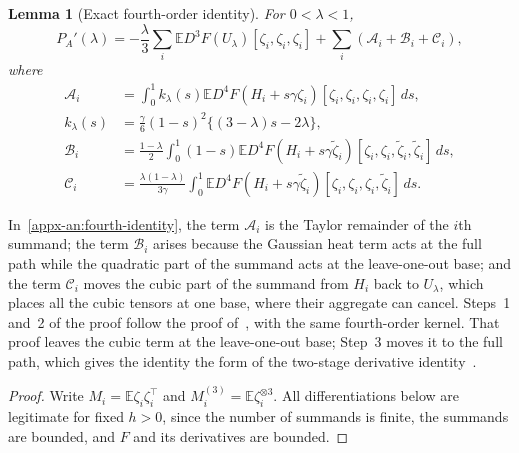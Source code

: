 \documentclass[11pt,letterpaper]{article}
\newif\ifshowrev
\newcommand{\rev}[1]{\ifshowrev{\color{revblue}%
\hypersetup{linkcolor=revblue,citecolor=revblue,urlcolor=revblue}#1}\else#1\fi}
\newenvironment{revblock}{\ifshowrev\color{revblue}%
\hypersetup{linkcolor=revblue,citecolor=revblue,urlcolor=revblue}\fi}{}
\newif\ifshowlin
\newcommand{\lin}[1]{\ifshowlin{\color{revblue}%
\hypersetup{linkcolor=revblue,citecolor=revblue,urlcolor=revblue}#1}\else#1\fi}
\newif\ifshowskill
\newcommand{\sks}[1]{\ifshowskill{\color{revblue}#1}\else#1\fi}
\newif\ifshownat
\newcommand{\nat}[1]{\ifshownat{\color{revblue}%
\hypersetup{linkcolor=revblue,citecolor=revblue,urlcolor=revblue}#1}\else#1\fi}
\newtheorem{lemma}{Lemma}
\theoremstyle{remark}
\newcommand{\E}{\mathbb E}
\newcommand{\dd}{\,d}
\begin{document}
\begin{revblock}
\begin{lemma}[Exact fourth-order identity]\label{appx-an:lem:identity}
For \(0<\lambda<1\),
\begin{equation}
 P_A'(\lambda)
 =-\frac\lambda3\sum_i\E D^3F(U_\lambda)
                    [\zeta_i,\zeta_i,\zeta_i]
       +\sum_i(\mathcal A_i+\mathcal B_i+\mathcal C_i),
 \label{appx-an:fourth-identity}
\end{equation}
where
\begin{align}
 \mathcal A_i
 &=\int_0^1 k_\lambda(s)
       \E D^4F(H_i+s\gamma\zeta_i)
                 [\zeta_i,\zeta_i,\zeta_i,\zeta_i]\dd s,
 \label{appx-an:A}\\
 k_\lambda(s)
 &=\frac\gamma6(1-s)^2\{(3-\lambda)s-2\lambda\},
 \label{appx-an:kernel}\\
 \mathcal B_i
 &=\frac{1-\lambda}{2}\int_0^1(1-s)
       \E D^4F(H_i+s\gamma\widetilde\zeta_i)
          [\zeta_i,\zeta_i,\widetilde\zeta_i,\widetilde\zeta_i]
       \dd s,
 \label{appx-an:B}\\
 \mathcal C_i
 &=\frac{\lambda(1-\lambda)}{3\gamma}\int_0^1
       \E D^4F(H_i+s\gamma\widetilde\zeta_i)
          [\zeta_i,\zeta_i,\zeta_i,\widetilde\zeta_i]\dd s.
 \label{appx-an:C}
\end{align}
\end{lemma}
\lin{In~\eqref{appx-an:fourth-identity}, the term \(\mathcal A_i\) is
the Taylor remainder of the \(i\)th summand; the term \(\mathcal B_i\) arises
because the Gaussian heat term acts at the full path while the quadratic
part of the summand acts at the leave-one-out base; and the term
\(\mathcal C_i\) moves the cubic part of the summand from \(H_i\) back to
\(U_\lambda\), which places all the cubic tensors at one base, where
their aggregate can cancel.}
\rev{Steps~1 and~2 of the proof follow \nat{the proof of~\cite[Lemma~4.1, eqs.~(20) and~(21)]{AL}}, with the same fourth-order kernel. \nat{That proof leaves} the cubic term at the leave-one-out base; Step~3 moves it to the full path, which
gives the identity the form of \nat{the two-stage derivative identity~\cite[Lemma~22, eq.~(15)]{GaoZhang}}.}

\begin{proof}
Write \(M_i=\E\zeta_i\zeta_i^\top\) and
\(\sks{M_i^{(3)}}=\E\zeta_i^{\otimes3}\). All differentiations below are
legitimate for fixed \(h>0\), since the number of summands is finite, the summands are
bounded, and \(F\) and its derivatives are bounded.


\end{proof}
\end{revblock}
\end{document}
